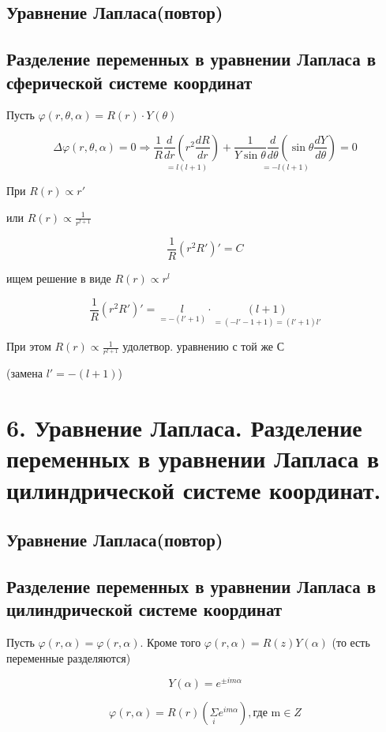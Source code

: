 \documentclass[a4paper,12pt]{article}
\newcommand{\fc}[1]{\[#1\]}
\begin{document}
\subsection*{Уравнение Лапласа(повтор)}

\subsection*{Разделение переменных в уравнении Лапласа в
сферической системе координат}

Пусть $\varphi(r,\theta,\alpha)=R(r)\cdot Y(\theta)$

\fc{\Delta \varphi(r,\theta,\alpha)=0\Rightarrow \underset{=l(l+1)}{\frac{1}{R}\frac{d}{dr} \left( r^2 \frac{dR}{dr} \right)}+\underset{=-l(l+1)}{\frac{1}{Y \sin \theta}\frac{d}{d\theta} \left( \sin \theta \frac{dY}{d\theta} \right)}=0}

При $R(r)\varpropto r'$

или $R(r)\varpropto \frac{1}{r^{l+1}}$

\fc{\frac{1}{R}(r^2R')'=C} 

ищем решение в виде $R(r)\varpropto r^l$

\fc{\frac{1}{R}(r^2R')'=\underset{=-(l'+1)}{l}\cdot \underset{=(-l'-1+1)=(l'+1)l'}{(l+1)}} 

При этом $R(r)\varpropto \frac{1}{r^{l+1}}$ удолетвор. уравнению с той же С 

(замена $l'=-(l+1)$) 

\section*{6. Уравнение Лапласа. Разделение переменных в уравнении Лапласа в
цилиндрической системе координат.}

\subsection*{Уравнение Лапласа(повтор)}

\subsection*{Разделение переменных в уравнении Лапласа в
цилиндрической системе координат}

Пусть $\varphi(r,\alpha)=\varphi(r,\alpha)$. Кроме того $\varphi(r,\alpha)=R(z)Y(\alpha)$
(то есть переменные разделяются)

\fc{Y(\alpha)=e^{\pm im\alpha}}

\fc{\varphi(r,\alpha)=R(r)(\underset{i}{\Sigma}e^{ im\alpha}),\text{где m}\in Z}
\end{document}
